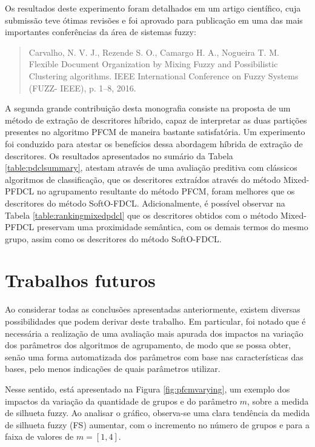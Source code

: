 Os resultados deste experimento foram detalhados em um artigo científico, cuja submissão teve ótimas revisões e foi aprovado para publicação em uma das mais importantes conferências da área de sistemas fuzzy:

\begin{quote}
Carvalho, N. V. J., Rezende S. O., Camargo H. A., Nogueira T. M. Flexible Document Organization by Mixing Fuzzy and Possibilistic Clustering algorithms. IEEE International Conference on Fuzzy Systems (FUZZ- IEEE), p. 1–8, 2016.
\end{quote}

A segunda grande contribuição desta monografia consiste na proposta de um método de extração de
descritores híbrido, capaz de interpretar as duas partições presentes no algoritmo PFCM de maneira
bastante satisfatória. Um experimento foi conduzido para atestar os
benefícios dessa abordagem híbrida de extração de descritores. Os resultados apresentados no sumário
da Tabela \ref{table:pdclsummary}, atestam através de uma avaliação preditiva com clássicos
algoritmos de classificação, que os descritores extraídos através do método Mixed-PFDCL no
agrupamento resultante do método PFCM, foram melhores que os descritores do método SoftO-FDCL.
Adicionalmente, é possível observar na Tabela \ref{table:rankingmixedpdcl} que os descritores obtidos com o método
Mixed-PFDCL preservam uma proximidade semântica, com os demais termos do mesmo grupo, assim como os
descritores do método SoftO-FDCL.

\section{Trabalhos futuros}

Ao considerar todas as conclusões apresentadas anteriormente, existem diversas possibilidades que
podem derivar deste trabalho. Em particular, foi notado que é necessária a realização de uma avaliação
mais apurada dos impactos na variação dos parâmetros dos algoritmos de agrupamento, de modo que se
possa obter, senão uma forma automatizada dos parâmetros com base nas características das bases,
pelo menos indicações de quais parâmetros utilizar. 

Nesse sentido, está apresentado na Figura \ref{fig:pfcmvarying}, um exemplo dos impactos da variação
da quantidade de grupos e do parâmetro $m$, sobre a medida de silhueta fuzzy. Ao analisar o gráfico,
observa-se uma clara tendência da medida de silhueta fuzzy (FS) aumentar, com o incremento no número
de grupos e para a faixa de valores de $m=[1,4]$. 

